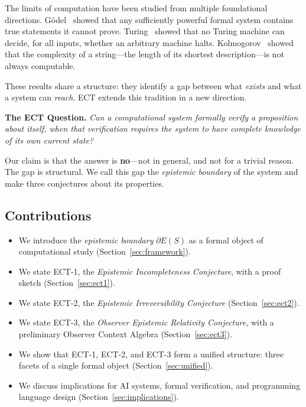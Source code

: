 \documentclass[12pt]{article}
\theoremstyle{definition}
\newcommand{\EB}{\partial E(S)}
\begin{document}
The limits of computation have been studied from multiple foundational directions. G\"{o}del~\cite{godel1931} showed that any sufficiently powerful formal system contains true statements it cannot prove. Turing~\cite{turing1936} showed that no Turing machine can decide, for all inputs, whether an arbitrary machine halts. Kolmogorov~\cite{kolmogorov1965} showed that the complexity of a string---the length of its shortest description---is not always computable.

These results share a structure: they identify a gap between what \emph{exists} and what a system can \emph{reach}. ECT extends this tradition in a new direction.

\medskip
\noindent\textbf{The ECT Question.} \emph{Can a computational system formally verify a proposition about itself, when that verification requires the system to have complete knowledge of its own current state?}

\medskip
Our claim is that the answer is \textbf{no}---not in general, and not for a trivial reason. The gap is structural. We call this gap the \emph{epistemic boundary} of the system and make three conjectures about its properties.

\subsection{Contributions}

\begin{itemize}[leftmargin=1.5em]
  \item We introduce the \emph{epistemic boundary} $\EB$ as a formal object of computational study (Section~\ref{sec:framework}).
  \item We state ECT-1, the \emph{Epistemic Incompleteness Conjecture}, with a proof sketch (Section~\ref{sec:ect1}).
  \item We state ECT-2, the \emph{Epistemic Irreversibility Conjecture} (Section~\ref{sec:ect2}).
  \item We state ECT-3, the \emph{Observer Epistemic Relativity Conjecture}, with a preliminary Observer Context Algebra (Section~\ref{sec:ect3}).
  \item We show that ECT-1, ECT-2, and ECT-3 form a unified structure: three facets of a single formal object (Section~\ref{sec:unified}).
  \item We discuss implications for AI systems, formal verification, and programming language design (Section~\ref{sec:implications}).
\end{itemize}
\end{document}
